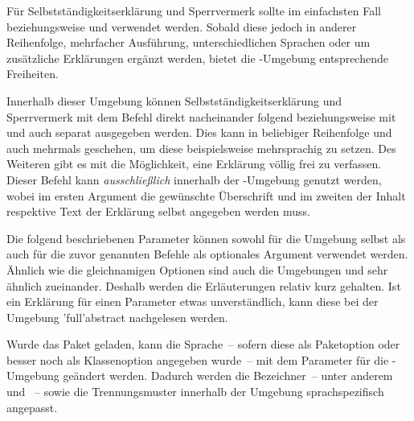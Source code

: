\begin{DeclareEntity*}{}
\begin{DeclareEntity*}{}
\begin{DeclareEntity*}{}
\begin{Declaration}
\begin{Declaration}
\begin{Declaration}
\begin{Declaration}
\begin{Declaration}
\begin{Declaration}
\begin{Declaration}
\begin{Declaration}
\begin{Declaration}
\begin{Declaration}
\begin{Declaration}
Für Selbstständigkeitserklärung und Sperrvermerk sollte im einfachsten Fall 
 beziehungsweise  und  
verwendet werden. Sobald diese jedoch in anderer Reihenfolge, mehrfacher 
Ausführung, unterschiedlichen Sprachen oder um zusätzliche Erklärungen ergänzt 
werden, bietet die -Umgebung entsprechende 
Freiheiten.

Innerhalb dieser Umgebung können Selbstständigkeitserklärung und Sperrvermerk 
mit dem Befehl  direkt nacheinander folgend beziehungsweise 
mit  und  auch separat ausgegeben werden. 
Dies kann in beliebiger Reihenfolge und auch mehrmals geschehen, um diese 
beispielsweise mehrsprachig zu setzen.
%
Des Weiteren gibt es mit  die 
Möglichkeit, eine Erklärung völlig frei zu verfassen. Dieser Befehl kann 
\emph{ausschließlich} innerhalb der -Umgebung 
genutzt werden, wobei im ersten Argument die gewünschte Überschrift und im 
zweiten der Inhalt respektive Text der Erklärung selbst angegeben werden muss.

Die folgend beschriebenen Parameter können sowohl für die Umgebung 
 selbst als auch für die zuvor genannten Befehle als 
optionales Argument verwendet werden. Ähnlich wie die gleichnamigen Optionen 
sind auch die Umgebungen  und  
sehr ähnlich zueinander. Deshalb werden die Erläuterungen relativ kurz 
gehalten. Ist ein Erklärung für einen Parameter etwas unverständlich, kann 
diese bei der Umgebung \Environment'full'{abstract} nachgelesen werden.

%
Wurde das Paket  geladen, kann die Sprache~-- sofern diese als 
Paketoption oder besser noch als Klassenoption angegeben wurde~-- mit dem 
Parameter  für die 
-Umgebung geändert werden. Dadurch werden die 
Bezeichner~-- unter anderem  und ~-- 
sowie die Trennungsmuster innerhalb der Umgebung sprachspezifisch angepasst. 


\end{Declaration}
\end{Declaration}
\end{Declaration}
\end{Declaration}
\end{Declaration}
\end{Declaration}
\end{Declaration}
\end{Declaration}
\end{Declaration}
\end{Declaration}
\end{Declaration}
\end{DeclareEntity*}
\end{DeclareEntity*}
\end{DeclareEntity*}

